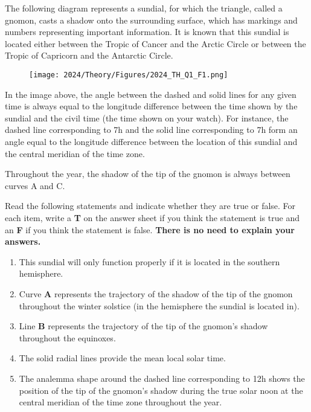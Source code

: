 The following diagram represents a sundial, for which the triangle, called a gnomon, casts a shadow onto the surrounding surface, which has markings and numbers representing important information. It is known that this sundial is located either between the Tropic of Cancer and the Arctic Circle or between the Tropic of Capricorn and the Antarctic Circle.

\begin{figure}[H]
    \centering
    \texttt{[image: 2024/Theory/Figures/2024\_TH\_Q1\_F1.png]}
\end{figure}

In the image above, the angle between the dashed and solid lines for any given time is always equal to the longitude difference between the time shown by the sundial and the civil time (the time shown on your watch). For instance, the dashed line corresponding to 7h and the solid line corresponding to 7h form an angle equal to the longitude difference between the location of this sundial and the central meridian of the time zone.

Throughout the year, the shadow of the tip of the gnomon is always between curves A and C.

Read the following statements and indicate whether they are true or false. For each item, write a \textbf{T} on the answer sheet if you think the statement is true and an \textbf{F} if you think the statement is false. \textbf{There is no need to explain your answers.}

\begin{enumerate}[label=(\alph*)]
    \item This sundial will only function properly if it is located in the southern hemisphere.

    \item Curve \textbf{A} represents the trajectory of the shadow of the tip of the gnomon throughout the winter solstice (in the hemisphere the sundial is located in).

    \item Line \textbf{B} represents the trajectory of the tip of the gnomon's shadow throughout the equinoxes.

    \item The solid radial lines provide the mean local solar time.

    \item  The analemma shape around the dashed line corresponding to 12h shows the position of the tip of the gnomon's shadow during the true solar noon at the central meridian of the time zone throughout the year.
\end{enumerate}